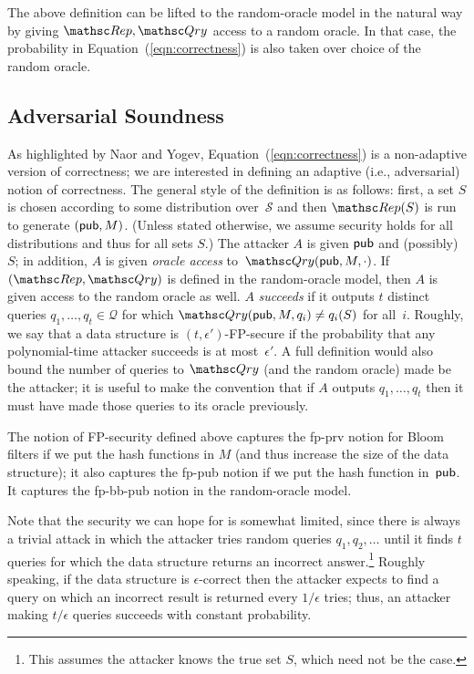 The above definition can be lifted to the random-oracle model in the natural way
by giving $\Rep, \Qry$ access to a random oracle. In that case,
the probability in Equation~(\ref{eqn:correctness})
is also taken over choice of the random oracle.

\subsection{Adversarial Soundness}
As highlighted by Naor and Yogev,
Equation~(\ref{eqn:correctness}) is a non-adaptive version of correctness;
we are interested in defining an adaptive (i.e., adversarial) notion
of correctness. 
The general style of the definition is as follows:
first, a set $S$ is chosen according to some distribution over~$\mathcal{S}$ and then
$\Rep(S)$ is run to generate $({\sf pub}, M)$. (Unless stated otherwise, we assume
security holds for all distributions and thus for all sets $S$.)
The attacker $A$ is given ${\sf pub}$ and (possibly)~$S$;
in addition, $A$ is given \emph{oracle access} to~$\Qry(\pub, M, \cdot)$.
If $(\Rep, \Qry)$ is defined in the random-oracle model, then
$A$ is given access to the random oracle as well.
$A$ \emph{succeeds} if it outputs $t$ distinct queries $q_1, \ldots, q_t \in \mathcal{Q}$ for which
$\Qry(\pub, M, q_i) \neq q_i(S)$ for all~$i$.
Roughly, we say that a data structure is $(t,\epsilon')$-FP-secure if the probability that
any polynomial-time attacker succeeds is at most~$\epsilon'$. A full definition
would also bound the number of queries to $\Qry$ (and the random oracle) made
be the attacker; it is useful to make the convention that if $A$ outputs
$q_1, \ldots, q_t$ then it must have made those queries to its oracle previously.

The notion of FP-security defined above captures the fp-prv notion for Bloom filters
if we put the hash
functions in $M$ (and thus increase the size of the data structure); it also captures the fp-pub
notion if we put the hash function in~${\sf pub}$.   It captures the fp-bb-pub notion in the
random-oracle model.

Note that the security we can hope for is somewhat limited, since there
is always a trivial attack in which
the attacker tries random queries $q_1, q_2, \ldots$ until it finds $t$ queries for which the
data structure returns an incorrect answer.\footnote{This assumes the attacker
knows the true set $S$, which need not be the case.} Roughly speaking,
if the data structure is $\epsilon$-correct then the attacker expects to find a query on which
an incorrect result is returned
every $1/\epsilon$ tries; thus, an
attacker making $t/\epsilon$ queries succeeds with constant probability.

